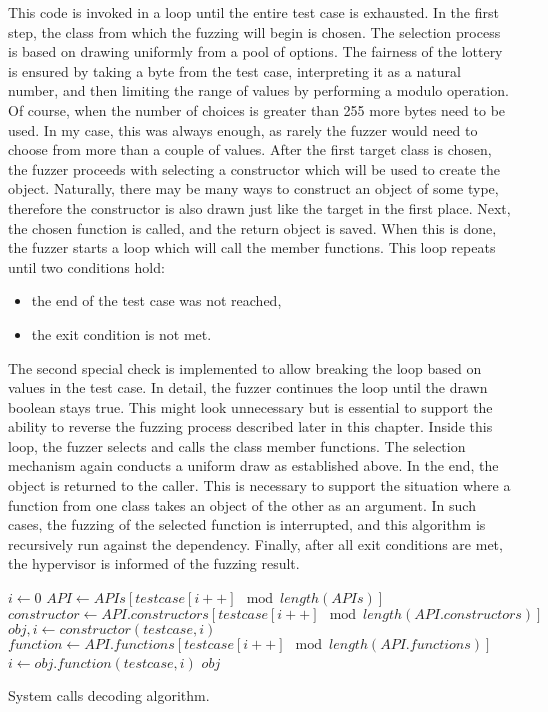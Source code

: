 This code is invoked in a loop until the entire test case is exhausted. In the first step, the class from which the fuzzing will begin is chosen. The selection process is based on drawing uniformly from a pool of options. The fairness of the lottery is ensured by taking a byte from the test case, interpreting it as a natural number, and then limiting the range of values by performing a modulo operation. Of course, when the number of choices is greater than 255 more bytes need to be used. In my case, this was always enough, as rarely the fuzzer would need to choose from more than a couple of values. After the first target class is chosen, the fuzzer proceeds with selecting a constructor which will be used to create the object. Naturally, there may be many ways to construct an object of some type, therefore the constructor is also drawn just like the target in the first place. Next, the chosen function is called, and the return object is saved. When this is done, the fuzzer starts a loop which will call the member functions. This loop repeats until two conditions hold:
\begin{itemize}
    \item the end of the test case was not reached,
    \item the exit condition is not met.
\end{itemize}
The second special check is implemented to allow breaking the loop based on values in the test case. In detail, the fuzzer continues the loop until the drawn boolean stays true. This might look unnecessary but is essential to support the ability to reverse the fuzzing process described later in this chapter. Inside this loop, the fuzzer selects and calls the class member functions. The selection mechanism again conducts a uniform draw as established above. In the end, the object is returned to the caller. This is necessary to support the situation where a function from one class takes an object of the other as an argument. In such cases, the fuzzing of the selected function is interrupted, and this algorithm is recursively run against the dependency. Finally, after all exit conditions are met, the hypervisor is informed of the fuzzing result.

\begin{algorithm}
    \begin{algorithmic}
        \State $i \gets 0$
        \State $API \gets APIs[testcase[i++] \mod length(APIs)]$
        \State $constructor \gets API.constructors[testcase[i++] \mod length(API.constructors)]$
        \State $obj, i \gets constructor(testcase, i)$
            \State $function \gets API.functions[testcase[i++] \mod length(API.functions)]$
            \State $i \gets obj.function(testcase, i)$
        \EndWhile
        \State \Return $obj$
    \end{algorithmic}
    \caption{System calls decoding algorithm.}
    \label{alg:syscall_decode}
\end{algorithm}

